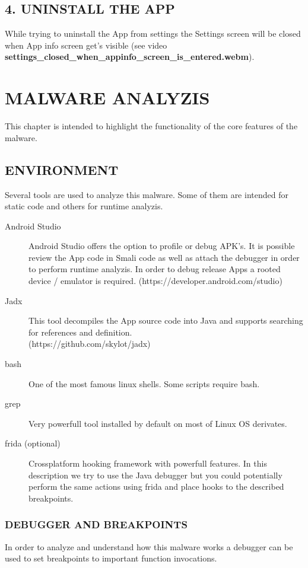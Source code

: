 \documentclass[10pt,titlepage]{article}
\begin{document}
\subsection{4. UNINSTALL THE APP}
While trying to uninstall the App from settings the Settings screen will be closed when App info screen get's visible (see video \textbf{settings\_closed\_when\_appinfo\_screen\_is\_entered.webm}).

\newpage
\section{MALWARE ANALYZIS}
This chapter is intended to highlight the functionality of the core features of the malware.

\subsection{ENVIRONMENT}
Several tools are used to analyze this malware. Some of them are intended for static code and others for runtime analyzis.

\begin{description}
\item[Android Studio] Android Studio offers the option to profile or debug APK's. It is possible review the App code in Smali code as well as attach the debugger in order to perform runtime analyzis. In order to debug release Apps a rooted device / emulator is required. (https://developer.android.com/studio)
\item[Jadx] This tool decompiles the App source code into Java and supports searching for references and definition. 
\\ (https://github.com/skylot/jadx)
\item[bash] One of the most famous linux shells. Some scripts require bash.
\item[grep] Very powerfull tool installed by default on most of Linux OS derivates.
\item[frida (optional)] Crossplatform hooking framework with powerfull features. In this description we try to use the Java debugger but you could potentially perform the same actions using frida and place hooks to the described breakpoints.
\end{description}

\subsubsection{DEBUGGER AND BREAKPOINTS}
In order to analyze and understand how this malware works a debugger can be used to set breakpoints to important function invocations.
\end{document}
